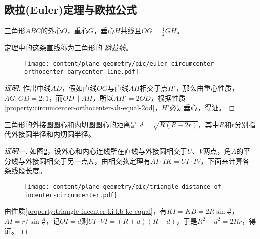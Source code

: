 \subsection{欧拉(Euler)定理与欧拉公式}
\label{sec:euler-theorem-and-euler-formula}

\begin{theorem}[欧拉(Euler)定理]
  三角形$ABC$的外心$O$，重心$G$，垂心$H$共线且$OG=\frac{1}{2}GH$。
\end{theorem}

定理中的这条直线称为三角形的 \emph{欧拉线}。

\begin{figure}[htbp]
\centering
\texttt{[image: content/plane-geometry/pic/euler-circumcenter-orthocenter-barycenter-line.pdf]}
\caption{}
\label{fig:euler-circumcenter-orthocenter-barycenter-line}
\end{figure}

\begin{proof}[证明]
  作出中线$AD$，假如直线$OG$与直线$AH$相交于点$H'$，那么由重心性质，$AG:GD=2:1$，而$OD \parallel AH$，所以$AH'=2OD$，根据性质\ref{property:circumcenter-orthocenter-ah-equal-2od}，$H'$必是垂心，得证。
\end{proof}

\begin{theorem}
  三角形的外接圆圆心和内切圆圆心的距离是 $d=\sqrt{R(R-2r)}$，其中$R$和$r$分别指代外接圆半径和内切圆半径。
\end{theorem}

\begin{proof}[证明一]
  如图\ref{fig:triangle-distance-of-incenter-circumcenter}，设外心和内心连线所在直线与外接圆相交于$U$、$V$两点，角$A$的平分线与外接圆相交于另一点$K$，由相交弦定理有$AI \cdot IK = UI \cdot IV$，下面来计算各条线段长度。
 
\begin{figure}[htbp]
\centering
\texttt{[image: content/plane-geometry/pic/triangle-distance-of-incenter-circumcenter.pdf]}
\caption{}
\label{fig:triangle-distance-of-incenter-circumcenter}
\end{figure}

由性质\ref{property:triangle-incenter-ki-kb-kc-equal}，有$KI=KB=2R\sin{\frac{A}{2}}$，$AI=r/ \sin{\frac{A}{2}}$，记$OI=d$则$UI\cdot VI=(R+d)(R-d)$，于是$R^2-d^2=2Rr$，得证。
\end{proof}


